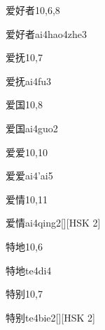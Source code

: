 \begin{entry}{爱好者}{10,6,8}
  \begin{phonetics}{爱好者}{ai4hao4zhe3}
  \end{phonetics}
\end{entry}

\begin{entry}{爱抚}{10,7}
  \begin{phonetics}{爱抚}{ai4fu3}
  \end{phonetics}
\end{entry}

\begin{entry}{爱国}{10,8}
  \begin{phonetics}{爱国}{ai4guo2}
  \end{phonetics}
\end{entry}

\begin{entry}{爱爱}{10,10}
  \begin{phonetics}{爱爱}{ai4'ai5}
  \end{phonetics}
\end{entry}

\begin{entry}{爱情}{10,11}
  \begin{phonetics}{爱情}{ai4qing2}[][HSK 2]
  \end{phonetics}
\end{entry}

\begin{entry}{特地}{10,6}
  \begin{phonetics}{特地}{te4di4}
  \end{phonetics}
\end{entry}

\begin{entry}{特别}{10,7}
  \begin{phonetics}{特别}{te4bie2}[][HSK 2]
  \end{phonetics}
\end{entry}

